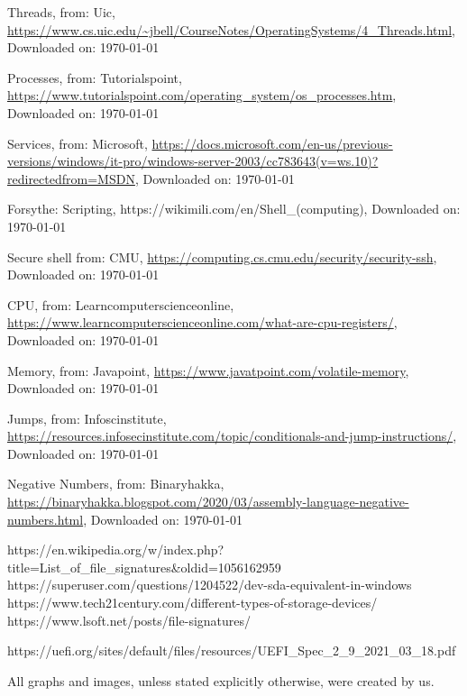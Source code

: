\begin{thebibliography}{10}
	Threads, from: Uic,
	\url{https://www.cs.uic.edu/~jbell/CourseNotes/OperatingSystems/4_Threads.html},
	Downloaded on: \today

	Processes, from: Tutorialspoint,
	\url{https://www.tutorialspoint.com/operating_system/os_processes.htm},
	Downloaded on: \today

	Services, from: Microsoft,
	\url{https://docs.microsoft.com/en-us/previous-versions/windows/it-pro/windows-server-2003/cc783643(v=ws.10)?redirectedfrom=MSDN},
	Downloaded on: \today

	Forsythe: Scripting,
	https://wikimili.com/en/Shell_(computing),
	Downloaded on: \today

	Secure shell from: CMU,
	\url{https://computing.cs.cmu.edu/security/security-ssh},
	Downloaded on: \today

	CPU, from: Learncomputerscienceonline,
	\url{https://www.learncomputerscienceonline.com/what-are-cpu-registers/},
	Downloaded on: \today

	Memory, from: Javapoint,
	\url{https://www.javatpoint.com/volatile-memory},
	Downloaded on: \today

	Jumps, from: Infoscinstitute,
	\url{https://resources.infosecinstitute.com/topic/conditionals-and-jump-instructions/},
	Downloaded on: \today

	Negative Numbers, from: Binaryhakka,
	\url{https://binaryhakka.blogspot.com/2020/03/assembly-language-negative-numbers.html},
	Downloaded on: \today

\end{thebibliography}


https://en.wikipedia.org/w/index.php?title=List\_of\_file\_signatures&oldid=1056162959
https://superuser.com/questions/1204522/dev-sda-equivalent-in-windows
https://www.tech21century.com/different-types-of-storage-devices/
https://www.lsoft.net/posts/file-signatures/

https://uefi.org/sites/default/files/resources/UEFI\_Spec\_2\_9\_2021\_03\_18.pdf

%
All graphs and images, unless stated explicitly otherwise, were created by us. 
